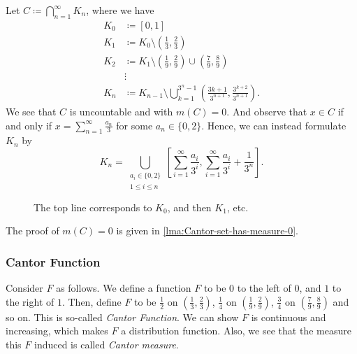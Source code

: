 \begin{eg}\label{eg:lec8:Cantor-set}
	Let \(C \coloneqq \bigcap\limits_{n=1}^{\infty} K_{n}\), where we have
	\[
		\begin{split}
			K_0 &\coloneqq [0, 1]\\
			K_1 &\coloneqq K_{0}\setminus \left(\frac{1}{3}, \frac{2}{3}\right)\\
			K_2 &\coloneqq K_{1}\setminus \left(\frac{1}{9}, \frac{2}{9}\right) \cup \left(\frac{7}{9}, \frac{8}{9}\right)\\
			&\vdots\\
			K_n &\coloneqq K_{n-1}\setminus \bigcup\limits_{k=1}^{3^n - 1}\left(\frac{3k+1}{3^{n+1}}, \frac{3^{k+2}}{3^{n+1}}\right).
		\end{split}
	\]
	We see that \(C\) is uncountable and with \(m(C) = 0\). And observe that \(x\in C\) if and only if \(x = \sum\limits_{n=1}^{\infty} \frac{a_n}{3}\) for some \(a_n\in\{0, 2\}\).
	Hence, we can instead formulate \(K_{n}\) by
	\[
		K_{n} = \bigcup\limits_{\substack{a_{i}\in\{0, 2\}\\ 1\leq i\leq n}}\left[\sum\limits_{i=1}^{\infty} \frac{a_{i}}{3^i}, \sum\limits_{i=1}^{\infty} \frac{a_{i}}{3^i} + \frac{1}{3^n}\right].
	\]

	\begin{figure}[H]
		\centering
		\caption{The top line corresponds to \(K_0\), and then \(K_1\), etc.}
	\end{figure}
	The proof of \(m(C) = 0\) is given in \autoref{lma:Cantor-set-has-measure-0}.
\end{eg}

\subsubsection{Cantor Function}\label{sssec:Cantor-Function}
Consider \(F\) as follows. We define a function \(F\) to be \(0\) to the left of \(0\),  and \(1\) to the right of \(1\). Then, define \(F\) to be \(\frac{1}{2}\)
on \(\left(\frac{1}{3}, \frac{2}{3}\right)\), \(\frac{1}{4}\) on \(\left(\frac{1}{9}, \frac{2}{9}\right)\), \(\frac{3}{4}\) on \(\left(\frac{7}{9}, \frac{8}{9}\right)\)
and so on. This is so-called \emph{Cantor Function}. We can show \(F\) is continuous and increasing, which makes \(F\) a distribution function.
Also, we see that the measure this \(F\) induced is called \emph{Cantor measure}\label{def:Cantor-measure}.

